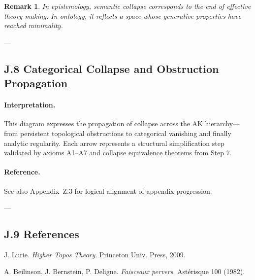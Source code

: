\documentclass[11pt]{article}
\newtheorem{remark}[theorem]{Remark}
\begin{document}
\begin{axiom}
\begin{axiom}
\begin{remark}
In epistemology, semantic collapse corresponds to the end of effective theory-making.  
In ontology, it reflects a space whose generative properties have reached minimality.
\end{remark}

---

\subsection*{J.8 Categorical Collapse and Obstruction Propagation}

\begin{center}
\end{center}

\paragraph{Interpretation.}
This diagram expresses the propagation of collapse across the AK hierarchy—from persistent topological obstructions to categorical vanishing and finally analytic regularity.
Each arrow represents a structural simplification step validated by axioms A1–A7 and collapse equivalence theorems from Step 7.

\paragraph{Reference.}
See also Appendix~Z.3 for logical alignment of appendix progression.

---

\subsection*{J.9 References}

\begin{thebibliography}{9}

J. Lurie.  
\textit{Higher Topos Theory}. Princeton Univ. Press, 2009.

A. Beilinson, J. Bernstein, P. Deligne.  
\textit{Faisceaux pervers}. Astérisque 100 (1982).


\end{thebibliography}
\end{axiom}
\end{axiom}
\end{document}

